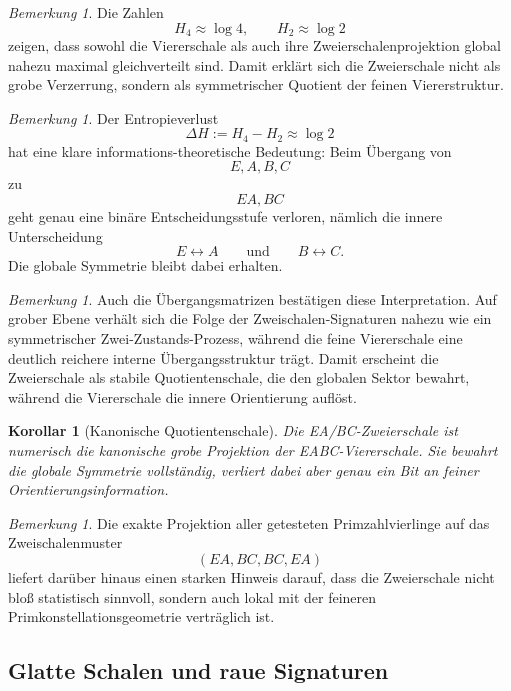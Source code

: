 \documentclass[11pt,a4paper]{article}
\newtheorem{korollar}[satz]{Korollar}
\theoremstyle{definition}
\theoremstyle{remark}
\newtheorem{bemerkung}[satz]{Bemerkung}
\begin{document}
	\begin{bemerkung}
		Die Zahlen
		\[
		H_4\approx \log 4,
		\qquad
		H_2\approx \log 2
		\]
		zeigen, dass sowohl die Viererschale als auch ihre Zweierschalenprojektion global nahezu
		maximal gleichverteilt sind. Damit erklärt sich die Zweierschale nicht als grobe
		Verzerrung, sondern als symmetrischer Quotient der feinen Viererstruktur.
	\end{bemerkung}
	
	\begin{bemerkung}
		Der Entropieverlust
		\[
		\Delta H:=H_4-H_2\approx \log 2
		\]
		hat eine klare informations-theoretische Bedeutung: Beim Übergang von
		\[
		E,A,B,C
		\]
		zu
		\[
		EA,BC
		\]
		geht genau eine binäre Entscheidungsstufe verloren, nämlich die innere Unterscheidung
		\[
		E\leftrightarrow A
		\qquad\text{und}\qquad
		B\leftrightarrow C.
		\]
		Die globale Symmetrie bleibt dabei erhalten.
	\end{bemerkung}
	
	\begin{bemerkung}
		Auch die Übergangsmatrizen bestätigen diese Interpretation. Auf grober Ebene verhält sich
		die Folge der Zweischalen-Signaturen nahezu wie ein symmetrischer Zwei-Zustands-Prozess,
		während die feine Viererschale eine deutlich reichere interne Übergangsstruktur trägt.
		Damit erscheint die Zweierschale als stabile Quotientenschale, die den globalen Sektor
		bewahrt, während die Viererschale die innere Orientierung auflöst.
	\end{bemerkung}
	
	\begin{korollar}[Kanonische Quotientenschale]
		\label{kor:kanonische_quotientenschale}
		Die EA/BC-Zweierschale ist numerisch die kanonische grobe Projektion der EABC-Viererschale.
		Sie bewahrt die globale Symmetrie vollständig, verliert dabei aber genau ein Bit an
		feiner Orientierungsinformation.
	\end{korollar}
	
	\begin{bemerkung}
		Die exakte Projektion aller getesteten Primzahlvierlinge auf das Zweischalenmuster
		\[
		(EA,BC,BC,EA)
		\]
		liefert darüber hinaus einen starken Hinweis darauf, dass die Zweierschale nicht bloß
		statistisch sinnvoll, sondern auch lokal mit der feineren Primkonstellationsgeometrie
		verträglich ist.
	\end{bemerkung}
	
	\subsection{Glatte Schalen und raue Signaturen}
	
\end{document}
